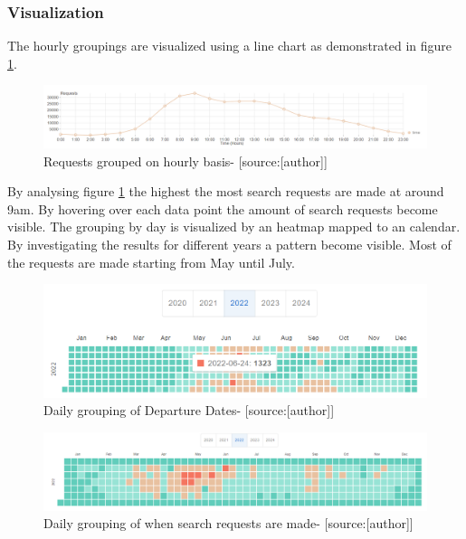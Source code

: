 \subsubsection{Visualization}
The hourly groupings are visualized using a line chart as demonstrated in figure \ref{fig:hourly_grouping}.
\begin{figure}[H]
	\centering
		\includegraphics[width=15cm]{images/requests_hour}
	\caption{Requests grouped on hourly basis- [source:[author]]}
	\label{fig:hourly_grouping}
\end{figure}
By analysing figure \ref{fig:hourly_grouping} the highest the most search requests are made at around 9am. By hovering over each data point the amount of search requests become visible. 
\newline
The grouping by day is visualized by an heatmap mapped to an calendar. By investigating the results for different years a pattern become visible. Most of the requests are made starting from May until July. 
\begin{figure}[H]
	\centering
		\includegraphics[width=15cm]{images/grouping_by_taskFrom}
	\caption{Daily grouping of Departure Dates- [source:[author]]}
	\label{fig:grouping_dep_daily}
\end{figure}

\begin{figure}[H]
	\centering
		\includegraphics[width=15cm]{images/grouping_by_created_at}
	\caption{Daily grouping of when search requests are made- [source:[author]]}
	\label{fig:grouping_search_daily}
\end{figure}
